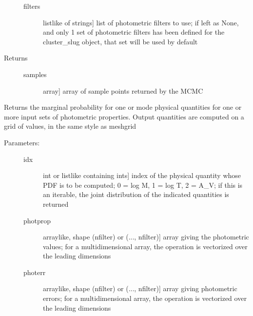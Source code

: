 \documentclass[letterpaper,10pt,english]{sphinxmanual}
\begin{document}
\begin{fulllineitems}
\begin{fulllineitems}
\begin{description}
\begin{description}
\item[{filters}] \leavevmode{[}listlike of strings{]}
list of photometric filters to use; if left as None, and
only 1 set of photometric filters has been defined for
the cluster\_slug object, that set will be used by
default

\end{description}

\item[{Returns}] \leavevmode\begin{description}
\item[{samples}] \leavevmode{[}array{]}
array of sample points returned by the MCMC

\end{description}

\end{description}

\end{fulllineitems}


\begin{fulllineitems}
\label{cluster_slug:slugpy.cluster_slug.cluster_slug.mpdf}
Returns the marginal probability for one or mode physical
quantities for one or more input sets of photometric
properties. Output quantities are computed on a grid of
values, in the same style as meshgrid
\begin{description}
\item[{Parameters:}] \leavevmode\begin{description}
\item[{idx}] \leavevmode{[}int or listlike containing ints{]}
index of the physical quantity whose PDF is to be
computed; 0 = log M, 1 = log T, 2 = A\_V; if this is an
iterable, the joint distribution of the indicated
quantities is returned

\item[{photprop}] \leavevmode{[}arraylike, shape (nfilter) or (..., nfilter){]}
array giving the photometric values; for a
multidimensional array, the operation is vectorized over
the leading dimensions

\item[{photerr}] \leavevmode{[}arraylike, shape (nfilter) or (..., nfilter){]}
array giving photometric errors; for a multidimensional
array, the operation is vectorized over the leading
dimensions


\end{description}
\end{description}
\end{fulllineitems}
\end{fulllineitems}
\end{document}
